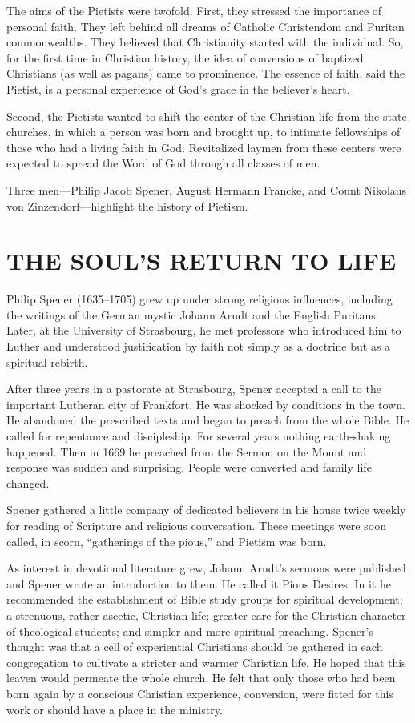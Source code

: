 The aims of the Pietists were twofold. First, they stressed the importance of personal faith. They
left behind all dreams of Catholic Christendom and Puritan commonwealths. They believed that
Christianity started with the individual. So, for the first time in Christian history, the idea of
conversions of baptized Christians (as well as pagans) came to prominence. The essence of faith,
said the Pietist, is a personal experience of God’s grace in the believer’s heart.

Second, the Pietists wanted to shift the center of the Christian life from the state churches, in
which a person was born and brought up, to intimate fellowships of those who had a living faith in
God. Revitalized laymen from these centers were expected to spread the Word of God through all
classes of men.

Three men—Philip Jacob Spener, August Hermann Francke, and Count Nikolaus von Zinzendorf—highlight
the history of Pietism.

\section{THE SOUL’S RETURN TO LIFE}

Philip Spener (1635–1705) grew up under strong religious influences, including the writings of the
German mystic Johann Arndt and the English Puritans. Later, at the University of Strasbourg, he met
professors who introduced him to Luther and understood justification by faith not simply as a
doctrine but as a spiritual rebirth.

After three years in a pastorate at Strasbourg, Spener accepted a call to the important Lutheran
city of Frankfort. He was shocked by conditions in the town. He abandoned the prescribed texts and
began to preach from the whole Bible. He called for repentance and discipleship. For several years
nothing earth-shaking happened. Then in 1669 he preached from the Sermon on the Mount and response
was sudden and surprising. People were converted and family life changed.

Spener gathered a little company of dedicated believers in his house twice weekly for reading of
Scripture and religious conversation. These meetings were soon called, in scorn, “gatherings of the
pious,” and Pietism was born.

As interest in devotional literature grew, Johann Arndt’s sermons were published and Spener wrote an
introduction to them. He called it Pious Desires. In it he recommended the establishment of Bible
study groups for spiritual development; a strenuous, rather ascetic, Christian life; greater care
for the Christian character of theological students; and simpler and more spiritual preaching.
Spener’s thought was that a cell of experiential Christians should be gathered in each congregation
to cultivate a stricter and warmer Christian life. He hoped that this leaven would permeate the
whole church. He felt that only those who had been born again by a conscious Christian experience,
conversion, were fitted for this work or should have a place in the ministry.

